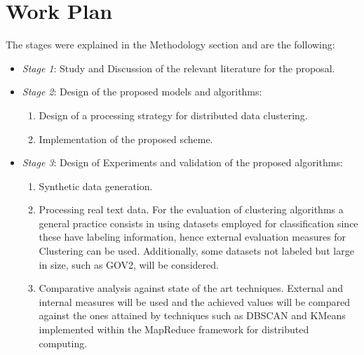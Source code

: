\documentclass[10pt]{article}
\begin{document}
\section{Work Plan}
The stages were explained in the Methodology section and are the following:
\begin{itemize}
\item \textit{Stage 1}: %
Study and Discussion of the relevant literature for the proposal.
\item \textit{Stage 2}: %
Design of the proposed models and algorithms: 
\begin{enumerate}
\item %
Design of a processing strategy for distributed data clustering.
\item %
Implementation of the proposed scheme.
\end{enumerate}
\item \textit{Stage 3}: %
    Design of Experiments and validation of the proposed algorithms: 
\begin{enumerate}
\item %
    Synthetic data generation.
\item %
    Processing real text data. For the evaluation of clustering algorithms a general practice consists in using datasets employed for classification since these have labeling information, hence external evaluation measures for Clustering can be used. Additionally, some datasets not labeled but large in size, such as GOV2, will be considered. 
\item %
    Comparative analysis against state of the art techniques. External and internal measures will be used and the achieved values will be compared against the ones attained by techniques such as DBSCAN and KMeans implemented within the MapReduce framework for distributed computing. 


\end{enumerate}
\end{itemize}
\end{document}
